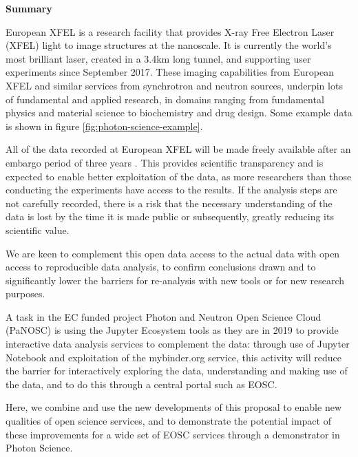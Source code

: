 \begin{task}[
  title=Reproducible photon science workflows at European XFEL,
  id=reproducibility-xfel,
  lead=XFEL,
  PM=38,
  wphases={7-48},
  partners={INSERM,SRL,UPSUD,EGI}
  ]

\textbf{Summary}

  European XFEL is a research facility that provides X-ray Free
  Electron Laser (XFEL) light to image structures at the nanoscale. It
  is currently the world's most brilliant laser, created in a 3.4km
  long tunnel, and supporting user experiments since September
  2017. These imaging capabilities from European XFEL and similar
  services from synchrotron and neutron sources, underpin lots of
  fundamental and applied research, in domains ranging from fundamental
  physics and material science to biochemistry and drug design. Some
  example data is shown in figure \ref{fig:photon-science-example}.

  All of the data recorded at European XFEL will be made freely
  available after an embargo period of three years
  \cite{EuXFEL-datapolicy-2017}. This provides scientific transparency
  and is expected to enable better exploitation of the data, as more
  researchers than those conducting the experiments have access to the
  results. If the analysis steps are not carefully recorded, there is a risk
  that the necessary understanding of the data is lost by the time it
  is made public or subsequently, greatly reducing its scientific
  value.

  We are keen to complement this open data access to the actual data
  with open access to reproducible data analysis, to confirm
  conclusions drawn and to significantly lower the barriers for
  re-analysis with new tools or for new research purposes.

  A task in the EC funded project Photon and Neutron Open Science
  Cloud (PaNOSC) is using the Jupyter Ecosystem tools as they are in
  2019 to provide interactive data analysis services to complement the
  data: through use of Jupyter Notebook and exploitation of the
  mybinder.org service, this activity will reduce the barrier for
  interactively exploring the data, understanding and making use of
  the data, and to do this through a central portal such as EOSC.

  Here, we combine and use the new developments of this
  proposal to enable new qualities of open science services, and to
  demonstrate the potential impact of these improvements for a wide
  set of EOSC services through a demonstrator in Photon Science.


\end{task}
